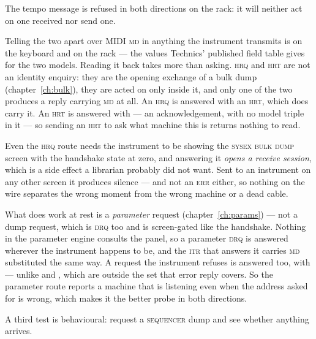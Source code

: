 The tempo message is refused in both directions on the rack: it will neither act on one
received nor send one.

\begin{note}{Telling the two apart over MIDI}
\textsc{md} in anything the instrument transmits is  on the keyboard and
 on the rack --- the values Technics' published field table gives for the two
models. Reading it back takes more than asking. \textsc{hrq} and \textsc{hrt} are not an
identity enquiry: they are the opening exchange of a bulk dump (chapter~\ref{ch:bulk}),
they are acted on only inside it, and only one of the two produces a reply carrying
\textsc{md} at all. An \textsc{hrq} is answered with an \textsc{hrt}, which does carry
it. An \textsc{hrt} is answered with  --- an acknowledgement, with
no model triple in it --- so sending an \textsc{hrt} to ask what machine this is returns
nothing to read.

Even the \textsc{hrq} route needs the instrument to be showing the \textsc{sysex bulk
dump} screen with the handshake state at zero, and answering it \emph{opens a receive
session}, which is a side effect a librarian probably did not want. Sent to an instrument
on any other screen it produces silence --- and not an \textsc{err} either, so nothing on
the wire separates the wrong moment from the wrong machine or a dead cable.

What does work at rest is a \emph{parameter} request (chapter~\ref{ch:params}) --- not a
dump request, which is \textsc{drq} too and is screen-gated like the handshake. Nothing in
the parameter engine consults the panel, so a parameter \textsc{drq} is answered wherever
the instrument happens to be, and the \textsc{itr} that answers it carries \textsc{md}
substituted the same way. A request the instrument refuses is answered too, with
 --- unlike  and , which are outside the set
that error reply covers. So the parameter route reports a machine that is listening even
when the address asked for is wrong, which makes it the better probe in both directions.

A third test is behavioural: request a \textsc{sequencer} dump and see whether anything
arrives.
\end{note}

